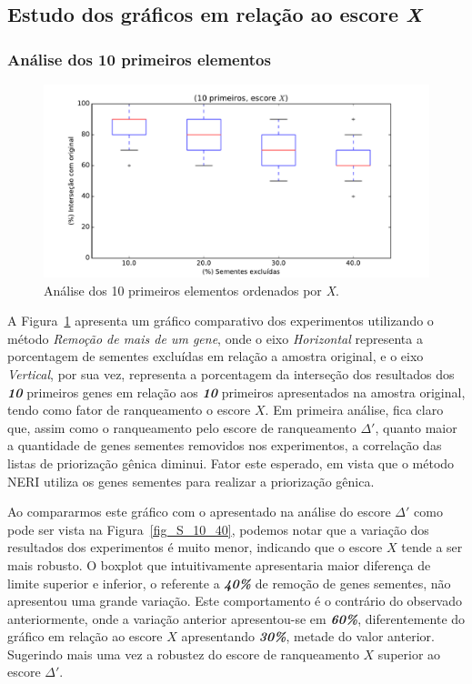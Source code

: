 %
%
%
%
%
\subsection{Estudo dos gráficos em relação ao escore \textit{X}}
\subsubsection{Análise dos 10 primeiros elementos}
%
\begin{figure}[ht!]
\centering
\includegraphics[width=\textwidth]{Images/analyses/fig_X_10_40.pdf}
\caption {Análise dos 10 primeiros elementos ordenados por \textit{X}.
\label{fig_X_10_40}}
\end{figure}
%
%

%
A Figura~\ref{fig_X_10_40} apresenta um gráfico comparativo dos experimentos utilizando o método \textit{Remoção de mais de um gene}, onde o eixo \textsl{Horizontal} representa a porcentagem de sementes excluídas em relação a amostra original, e o eixo \textsl{Vertical}, por sua vez, representa a porcentagem da interseção dos resultados dos \textsl{\textbf{10}} primeiros genes em relação aos \textsl{\textbf{10}} primeiros apresentados na amostra original, tendo como fator de ranqueamento o escore $X$.
%
Em primeira análise, fica claro que, assim como o ranqueamento pelo escore de ranqueamento $\Delta'$, quanto maior a quantidade de genes sementes removidos nos experimentos, a correlação das listas de priorização gênica diminui. Fator este esperado, em vista que o método NERI utiliza os genes sementes para realizar a priorização gênica.
%

Ao compararmos este gráfico com o apresentado na análise do escore $\Delta'$ como pode ser vista na Figura~\ref{fig_S_10_40}, podemos notar que a variação dos resultados dos experimentos é muito menor, indicando que o escore $X$ tende a ser mais robusto. O boxplot que intuitivamente apresentaria maior diferença de limite superior e inferior, o referente a \textbf{\textsl{40\%}} de remoção de genes sementes, não apresentou uma grande variação. Este comportamento é o contrário do observado anteriormente, onde a variação anterior apresentou-se em \textbf{\textsl{60\%}}, diferentemente do gráfico em relação ao escore \textbf{$X$} apresentando \textbf{\textsl{30\%}}, metade do valor anterior. Sugerindo mais uma vez a robustez do escore de ranqueamento $X$ superior ao escore $\Delta'$.

